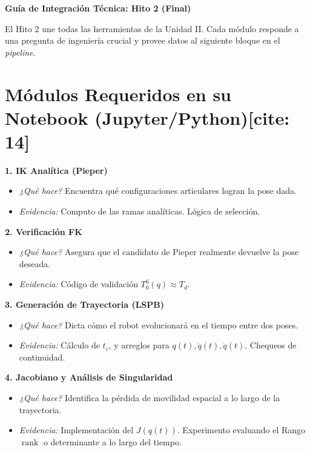 \documentclass[11pt, a4paper]{article}
\begin{document}
\begin{center}
    \Large\textbf{\textcolor{ucbblue}{Guía de Integración Técnica: Hito 2 (Final)}}\\[0.2cm]
\end{center}

\begin{tcolorbox}[colback=yellow!10, colframe=black, title=\textbf{Flujo Operativo Integrado[cite: 14]}]
    El Hito 2 une todas las herramientas de la Unidad II. Cada módulo responde a una pregunta de ingeniería crucial y provee datos al siguiente bloque en el \textit{pipeline}.
\end{tcolorbox}

\section*{Módulos Requeridos en su Notebook (Jupyter/Python)[cite: 14]}

\textbf{1. IK Analítica (Pieper)}
\begin{itemize}
    \item \textit{¿Qué hace?} Encuentra qué configuraciones articulares logran la pose dada.
    \item \textit{Evidencia:} Computo de las ramas analíticas. Lógica de selección.
\end{itemize}

\textbf{2. Verificación FK}
\begin{itemize}
    \item \textit{¿Qué hace?} Asegura que el candidato de Pieper realmente devuelve la pose deseada.
    \item \textit{Evidencia:} Código de validación $T_0^6(q) \approx T_d$.
\end{itemize}

\textbf{3. Generación de Trayectoria (LSPB)}
\begin{itemize}
    \item \textit{¿Qué hace?} Dicta cómo el robot evolucionará en el tiempo entre dos poses.
    \item \textit{Evidencia:} Cálculo de $t_c$, y arreglos para $q(t), \dot{q}(t), \ddot{q}(t)$. Chequeos de continuidad.
\end{itemize}

\textbf{4. Jacobiano y Análisis de Singularidad}
\begin{itemize}
    \item \textit{¿Qué hace?} Identifica la pérdida de movilidad espacial a lo largo de la trayectoria.
    \item \textit{Evidencia:} Implementación del $J(q(t))$. Experimento evaluando el Rango $\operatorname{rank}$ o determinante a lo largo del tiempo.
\end{itemize}
\end{document}
